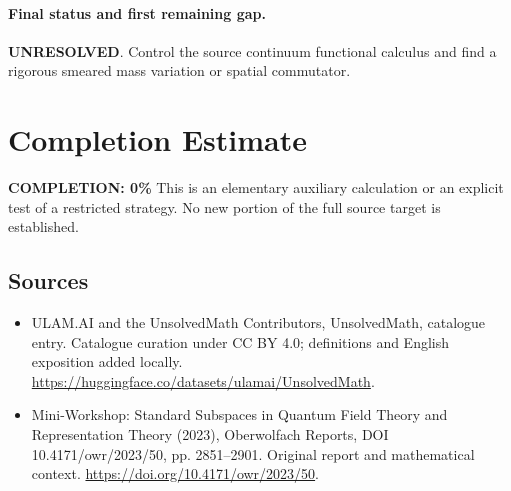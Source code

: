 \documentclass[11pt]{article}
\begin{document}
\paragraph{Final status and first remaining gap.}
\textbf{UNRESOLVED}. Control the source continuum functional calculus and find a rigorous smeared mass variation or spatial commutator.

\section{Completion Estimate}
\noindent\textbf{COMPLETION: 0\%}
This is an elementary auxiliary calculation or an explicit test of a restricted strategy. No new portion of the full source target is established.

\subsection{Sources}
\begin{itemize}
\item[\hypertarget{source:statement:1}{S1}] ULAM.AI and the UnsolvedMath Contributors, UnsolvedMath, catalogue entry. Catalogue curation under CC BY 4.0; definitions and English exposition added locally.
\url{https://huggingface.co/datasets/ulamai/UnsolvedMath}.
\item[\hypertarget{source:statement:2}{S2}] Mini-Workshop: Standard Subspaces in Quantum Field Theory and Representation Theory (2023), Oberwolfach Reports, DOI 10.4171/owr/2023/50, pp. 2851--2901. Original report and mathematical context.
\url{https://doi.org/10.4171/owr/2023/50}.
\end{itemize}
\label{end:statement}
\end{document}

